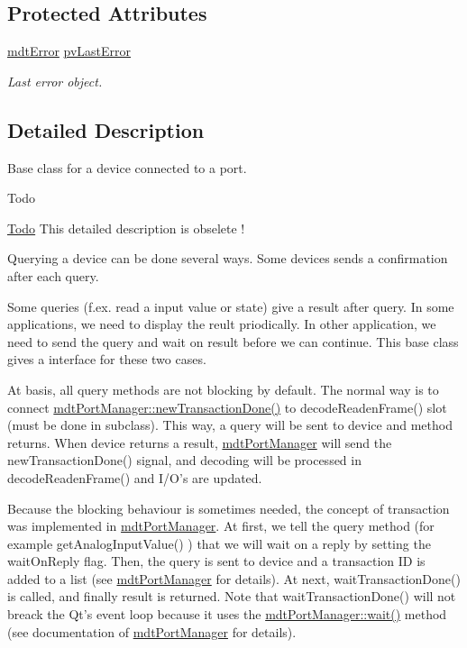 \subsection*{Protected Attributes}
\begin{DoxyCompactItemize}
\item 
\hyperlink{classmdt_error}{mdt\-Error} \hyperlink{classmdt_device_ab54221195bbf9363f7e7f10ef38a3909}{pv\-Last\-Error}
\begin{DoxyCompactList}\small\item\em Last error object. \end{DoxyCompactList}\end{DoxyCompactItemize}


\subsection{Detailed Description}
Base class for a device connected to a port. 

\begin{DoxyRefDesc}{Todo}
\item[\hyperlink{todo__todo000010}{Todo}]This detailed description is obselete !\end{DoxyRefDesc}


Querying a device can be done several ways. Some devices sends a confirmation after each query.

Some queries (f.\-ex. read a input value or state) give a result after query. In some applications, we need to display the reult priodically. In other application, we need to send the query and wait on result before we can continue. This base class gives a interface for these two cases.

At basis, all query methods are not blocking by default. The normal way is to connect \hyperlink{classmdt_port_manager_a416a24db1048e9f66aef27ea810954d2}{mdt\-Port\-Manager\-::new\-Transaction\-Done()} to decode\-Readen\-Frame() slot (must be done in subclass). This way, a query will be sent to device and method returns. When device returns a result, \hyperlink{classmdt_port_manager}{mdt\-Port\-Manager} will send the new\-Transaction\-Done() signal, and decoding will be processed in decode\-Readen\-Frame() and I/\-O's are updated.

Because the blocking behaviour is sometimes needed, the concept of transaction was implemented in \hyperlink{classmdt_port_manager}{mdt\-Port\-Manager}. At first, we tell the query method (for example get\-Analog\-Input\-Value() ) that we will wait on a reply by setting the wait\-On\-Reply flag. Then, the query is sent to device and a transaction I\-D is added to a list (see \hyperlink{classmdt_port_manager}{mdt\-Port\-Manager} for details). At next, wait\-Transaction\-Done() is called, and finally result is returned. Note that wait\-Transaction\-Done() will not breack the Qt's event loop because it uses the \hyperlink{classmdt_port_manager_aaa85e0200aba0e0f4392dfe01abae2cf}{mdt\-Port\-Manager\-::wait()} method (see documentation of \hyperlink{classmdt_port_manager}{mdt\-Port\-Manager} for details).

